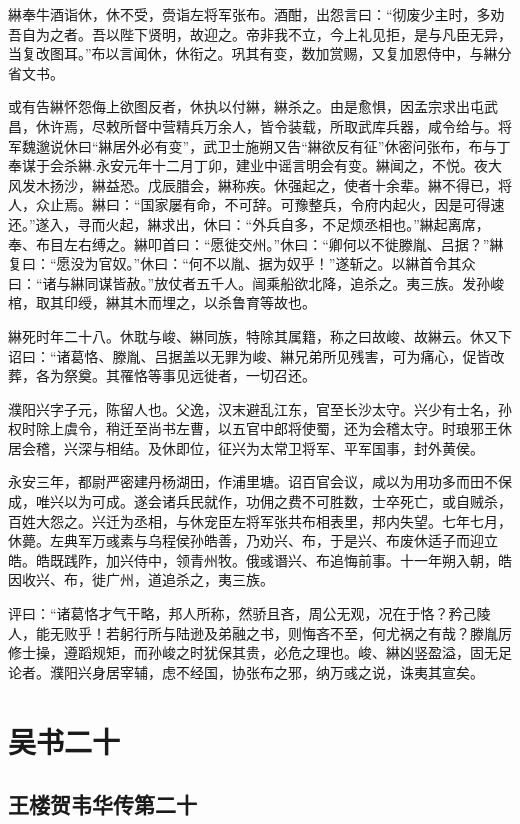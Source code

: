 \documentclass[12pt,UTF8]{ctexbook}
\begin{document}
綝奉牛酒诣休，休不受，赍诣左将军张布。酒酣，出怨言曰：“彻废少主时，多劝吾自为之者。吾以陛下贤明，故迎之。帝非我不立，今上礼见拒，是与凡臣无异，当复改图耳。”布以言闻休，休衔之。巩其有变，数加赏赐，又复加恩侍中，与綝分省文书。

或有告綝怀怨侮上欲图反者，休执以付綝，綝杀之。由是愈惧，因孟宗求出屯武昌，休许焉，尽敕所督中营精兵万余人，皆令装载，所取武库兵器，咸令给与。将军魏邈说休曰“綝居外必有变”，武卫士施朔又告“綝欲反有征”休密问张布，布与丁奉谋于会杀綝.永安元年十二月丁卯，建业中谣言明会有变。綝闻之，不悦。夜大风发木扬沙，綝益恐。戊辰腊会，綝称疾。休强起之，使者十余辈。綝不得已，将人，众止焉。綝曰：“国家屡有命，不可辞。可豫整兵，令府内起火，因是可得速还。”遂入，寻而火起，綝求出，休曰：“外兵自多，不足烦丞相也。”綝起离席，奉、布目左右缚之。綝叩首曰：“愿徙交州。”休曰：“卿何以不徙滕胤、吕据？”綝复曰：“愿没为官奴。”休曰：“何不以胤、据为奴乎！”遂斩之。以綝首令其众曰：“诸与綝同谋皆赦。”放仗者五千人。闿乘船欲北降，追杀之。夷三族。发孙峻棺，取其印绶，綝其木而埋之，以杀鲁育等故也。

綝死时年二十八。休耽与峻、綝同族，特除其属籍，称之曰故峻、故綝云。休又下诏曰：“诸葛恪、滕胤、吕据盖以无罪为峻、綝兄弟所见残害，可为痛心，促皆改葬，各为祭奠。其罹恪等事见远徙者，一切召还。

濮阳兴字子元，陈留人也。父逸，汉末避乱江东，官至长沙太守。兴少有士名，孙权时除上虞令，稍迁至尚书左曹，以五官中郎将使蜀，还为会稽太守。时琅邪王休居会稽，兴深与相结。及休即位，征兴为太常卫将军、平军国事，封外黄侯。

永安三年，都尉严密建丹杨湖田，作浦里塘。诏百官会议，咸以为用功多而田不保成，唯兴以为可成。遂会诸兵民就作，功佣之费不可胜数，士卒死亡，或自贼杀，百姓大怨之。兴迁为丞相，与休宠臣左将军张共布相表里，邦内失望。七年七月，休薨。左典军万彧素与乌程侯孙皓善，乃劝兴、布，于是兴、布废休适子而迎立皓。皓既践阼，加兴侍中，领青州牧。俄彧谮兴、布追悔前事。十一年朔入朝，皓因收兴、布，徙广州，道追杀之，夷三族。

评曰：“诸葛恪才气干略，邦人所称，然骄且吝，周公无观，况在于恪？矜己陵人，能无败乎！若躬行所与陆逊及弟融之书，则悔吝不至，何尤祸之有哉？滕胤厉修士操，遵蹈规矩，而孙峻之时犹保其贵，必危之理也。峻、綝凶竖盈溢，固无足论者。濮阳兴身居宰辅，虑不经国，协张布之邪，纳万彧之说，诛夷其宣矣。

\part{吴书二十}
\chapter{王楼贺韦华传第二十}
\end{document}
